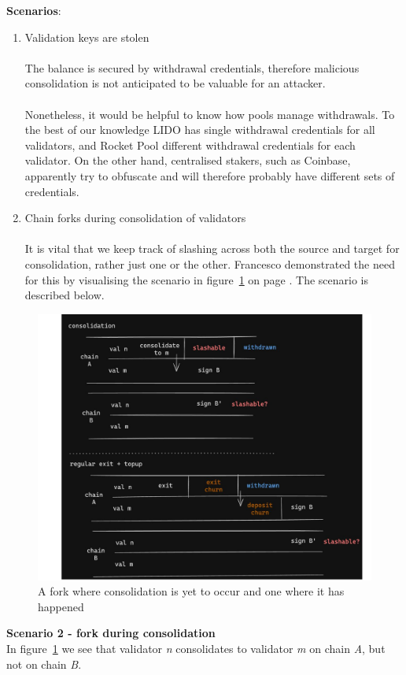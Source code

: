 \noindent
\textbf{Scenarios}: 
\begin{enumerate}
\item Validation keys are stolen\\
\\
The balance is secured by withdrawal credentials, therefore malicious consolidation is not anticipated to be valuable for an attacker. \\
\\
Nonetheless, it would be helpful to know how pools manage withdrawals. To the best of our knowledge LIDO has single withdrawal credentials for all validators, and Rocket Pool different withdrawal credentials for each validator. On the other hand, centralised stakers, such as Coinbase, apparently try to obfuscate and will therefore probably have different sets of credentials.

\item Chain forks during consolidation of validators \\
\\
It is vital that we keep track of slashing across both the source and target for consolidation, rather just one or the other. Francesco demonstrated the need for this by visualising the scenario in figure~\ref{fig:francesco1} on page \pageref{fig:francesco1}. The scenario is described below.
\end{enumerate}

\begin{figure}[htbp]
\begin{center}
\includegraphics[width=0.7\linewidth]{images/francesco1}
\caption{A fork where consolidation is yet to occur and one where it has happened}
\label{fig:francesco1}
\end{center}
\end{figure}

\noindent
\textbf{Scenario 2 - fork during consolidation} \\
In figure~\ref{fig:francesco1} we see that validator \textit{n} consolidates to validator \textit{m} on chain \textit{A}, but not on chain \textit{B}. 

